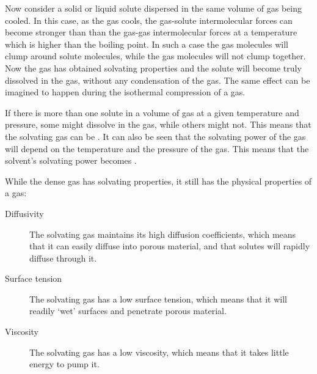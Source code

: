 Now consider a solid or liquid solute dispersed in the same volume of gas being
cooled. In this case, as the gas cools, the gas-solute intermolecular forces can
become stronger than than the gas-gas intermolecular forces at a temperature
which is higher than the boiling point. In such a case the gas molecules will
clump around solute molecules, while the gas molecules will not clump together.
Now the gas has obtained solvating properties and the solute will become truly
dissolved in the gas, without any condensation of the gas. The same effect can
be imagined to happen during the isothermal compression of a gas.

If there is more than one solute in a volume of gas at a given temperature and
pressure, some might dissolve in the gas, while others might not. This means
that the solvating gas can be . It can also be seen that the
solvating power of the gas will depend on the temperature and the pressure of
the gas. This means that the solvent's solvating power becomes
.

While the dense gas has solvating properties, it still has the physical
properties of a gas:

\begin{description} 

\item[Diffusivity] The solvating gas maintains its high diffusion coefficients,
which means that it can easily diffuse into porous material, and that solutes
will rapidly diffuse through it.

\item[Surface tension] The solvating gas has a low surface tension, which means
that it will readily `wet' surfaces and penetrate porous material.

\item[Viscosity] The solvating gas has a low viscosity, which means that it
takes little energy to pump it.

\end{description} 

